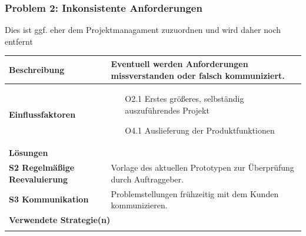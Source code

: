 \documentclass[fontsize=12pt,paper=a4,twoside]{scrartcl}
\begin{document}
\subsubsection{Problem 2: Inkonsistente Anforderungen}
\huge
Dies ist ggf. eher dem Projektmanagament zuzuordnen und wird daher noch entfernt
\normalsize
\begin{tabularx}{\textwidth}{|p{6cm}|X|}
 \hline
 \textbf{Beschreibung} & Eventuell werden Anforderungen missverstanden oder falsch kommuniziert.\\\hline
 \textbf{Einflussfaktoren} &
 \begin{itemize}
 \item[O2.1] Erstes größeres, selbständig auszuführendes Projekt
 \item[O4.1] Auslieferung der Produktfunktionen
 \end{itemize}\\\hline
\multicolumn{2}{|l|}{\textbf{Lösungen}} \\\hline

\textbf{S2 Regelmäßige Reevaluierung} & Vorlage des aktuellen Prototypen zur Überprüfung durch Auftraggeber. \\
\textbf{S3 Kommunikation} & Problemstellungen frühzeitig mit dem Kunden kommunizieren. \\\hline
 
\multicolumn{2}{|l|}{\textbf{Verwendete Strategie(n)}} \\\hline
    & \\\hline

\end{tabularx}
\newpage
\end{document}
